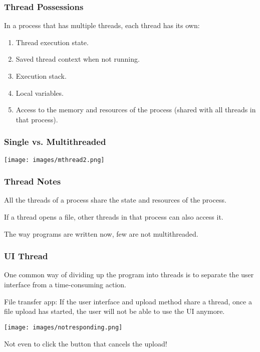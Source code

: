 \begin{frame}
	\frametitle{Thread Possessions}


	In a process that has multiple threads, each thread has its own:
	\begin{enumerate}
		\item Thread execution state.
		\item Saved thread context when not running.
		\item Execution stack.
		\item Local variables.
		\item Access to the memory and resources of the process (shared with all threads in that process).
	\end{enumerate}

\end{frame}

\begin{frame}
	\frametitle{Single vs. Multithreaded}

	\begin{center}
		\texttt{[image: images/mthread2.png]}
	\end{center}

\end{frame}

\begin{frame}
	\frametitle{Thread Notes}

	All the threads of a process share the state and resources of the process.

	If a thread opens a file, other threads in that process can also access it.

	The way programs are written now, few are not multithreaded.



\end{frame}

\begin{frame}
	\frametitle{UI Thread}

	One common way of dividing up the program into threads is to separate the user interface from a time-consuming action.


	File transfer app: If the user interface and upload method share a thread, once a file upload has started, the user will not be able to use the UI anymore.
	
	\begin{center}
	\texttt{[image: images/notresponding.png]}
	\end{center}

	Not even to click the button that cancels the upload!

\end{frame}

